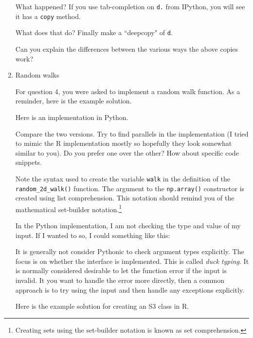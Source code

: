\documentclass{article}
\begin{document}
\begin{enumerate}
What happened?  If you use tab-completion on \texttt{d.} from IPython, you will
see it has a \texttt{copy} method. 


What does that do?  Finally make a ``deepcopy" of \texttt{d}.


Can you explain the differences between the various ways the above copies work?

\clearpage 
\item Random walks

For question 4, you were asked to implement a random walk function. As a
reminder, here is the example solution.


Here is an implementation in Python.


Compare the two versions.  Try to find parallels in the implementation (I tried
to mimic the R implementation mostly so hopefully they look somewhat similar to
you).  Do you prefer one over the other?  How about specific code snippets.

Note the syntax used to create the variable \texttt{walk} in the definition of
the \texttt{random\_2d\_walk()} function.  The argument to the
\texttt{np.array()} constructor is created using list comprehension.  This
notation should remind you of the mathematical set-builder
notation.\footnote{Creating sets using the set-builder notation is known as set
comprehension.}

In the Python implementation, I am not checking the type and value of my input.
If I wanted to so, I could something like this:


It is generally not consider Pythonic to check argument types explicitly.  The
focus is on whether the interface is implemented.  This is called \emph{duck
typing}.  It is normally considered desirable to let the function error if
the input is invalid.  It you want to handle the error more directly, then a
common approach is to try using the input and then handle any exceptions
explicitly.

\clearpage 
Here is the example solution for creating an S3 class in R. 


\end{enumerate}
\end{document}
